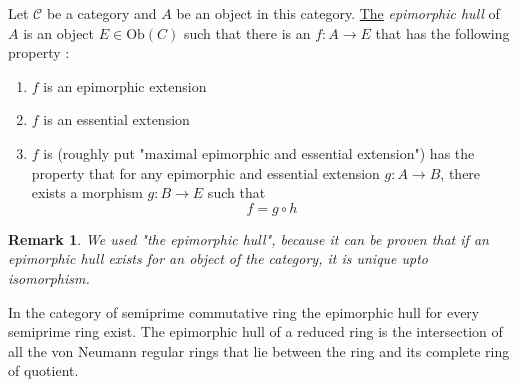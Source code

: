 \documentclass[12pt]{article}
\newtheorem{remark}[theorem]{Remark}
\begin{document}
Let $\mathcal C$ be a category and $A$ be an object in this category. \underline{The} \emph{epimorphic hull} of $A$ is an 
object $E\in\mathrm{Ob}(C)$ such that there is an $f:A\rightarrow E$ that has the following property :

\begin{enumerate}
\item $f$ is an epimorphic extension
\item $f$ is an essential extension
\item $f$ is (roughly put "maximal epimorphic and essential extension") has the property that for any 
epimorphic and essential extension $g:A\rightarrow B$, there exists a morphism $g:B\rightarrow E$ such that
$$f=g\circ h$$
\end{enumerate}

\begin{remark}
We used "the epimorphic hull", because it can be proven that if an epimorphic hull exists for an object of the category,
it is unique upto isomorphism.
\end{remark}

In the category of semiprime commutative ring the epimorphic hull for every semiprime ring exist. The epimorphic hull of a reduced ring is the intersection of all the von Neumann regular rings that lie between the ring and its complete ring of quotient.
\end{document}
